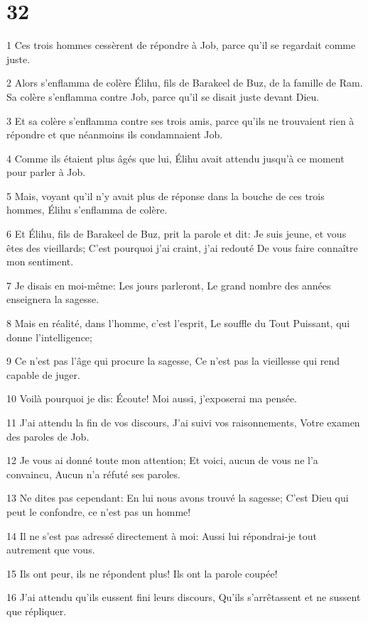 \chapter{32}

\par 1 Ces trois hommes cessèrent de répondre à Job, parce qu'il se regardait comme juste.
\par 2 Alors s'enflamma de colère Élihu, fils de Barakeel de Buz, de la famille de Ram. Sa colère s'enflamma contre Job, parce qu'il se disait juste devant Dieu.
\par 3 Et sa colère s'enflamma contre ses trois amis, parce qu'ils ne trouvaient rien à répondre et que néanmoins ils condamnaient Job.
\par 4 Comme ils étaient plus âgés que lui, Élihu avait attendu jusqu'à ce moment pour parler à Job.
\par 5 Mais, voyant qu'il n'y avait plus de réponse dans la bouche de ces trois hommes, Élihu s'enflamma de colère.
\par 6 Et Élihu, fils de Barakeel de Buz, prit la parole et dit: Je suis jeune, et vous êtes des vieillards; C'est pourquoi j'ai craint, j'ai redouté De vous faire connaître mon sentiment.
\par 7 Je disais en moi-même: Les jours parleront, Le grand nombre des années enseignera la sagesse.
\par 8 Mais en réalité, dans l'homme, c'est l'esprit, Le souffle du Tout Puissant, qui donne l'intelligence;
\par 9 Ce n'est pas l'âge qui procure la sagesse, Ce n'est pas la vieillesse qui rend capable de juger.
\par 10 Voilà pourquoi je dis: Écoute! Moi aussi, j'exposerai ma pensée.
\par 11 J'ai attendu la fin de vos discours, J'ai suivi vos raisonnements, Votre examen des paroles de Job.
\par 12 Je vous ai donné toute mon attention; Et voici, aucun de vous ne l'a convaincu, Aucun n'a réfuté ses paroles.
\par 13 Ne dites pas cependant: En lui nous avons trouvé la sagesse; C'est Dieu qui peut le confondre, ce n'est pas un homme!
\par 14 Il ne s'est pas adressé directement à moi: Aussi lui répondrai-je tout autrement que vous.
\par 15 Ils ont peur, ils ne répondent plus! Ils ont la parole coupée!
\par 16 J'ai attendu qu'ils eussent fini leurs discours, Qu'ils s'arrêtassent et ne sussent que répliquer.
